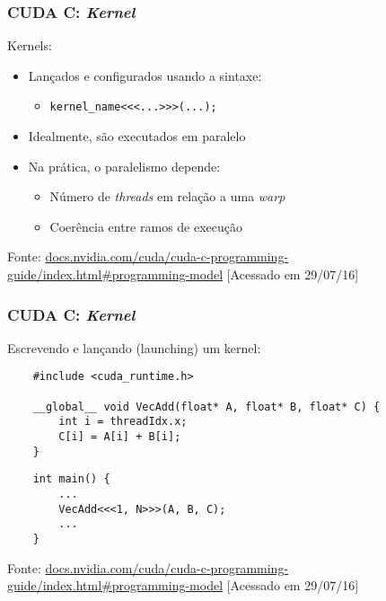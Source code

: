\documentclass[10pt, compress, aspectratio=43, xcolor={table,usenames,dvipsnames}]{beamer}
\begin{document}
\begin{frame}
    \frametitle{CUDA C: \textit{Kernel}}
    \alert{Kernels}:
    \begin{itemize}
        \item Lançados e configurados usando a sintaxe:
            \begin{itemize}
                \item \texttt{kernel\_name\alert{<<<}...\alert{>>>}(...);}
            \end{itemize}
        \item Idealmente, são executados em \alert{paralelo}
        \item Na prática, o paralelismo depende:
            \begin{itemize}
                \item Número de \textit{threads} em relação a uma \textit{warp}
                \item Coerência entre ramos de execução
            \end{itemize}
    \end{itemize}

    \vfill

    \begin{center}
        \tiny{Fonte: \url{docs.nvidia.com/cuda/cuda-c-programming-guide/index.html\#programming-model} [Acessado em 29/07/16]}
    \end{center}
\end{frame}

\begin{frame}[fragile]
    \frametitle{CUDA C: \textit{Kernel}}
    Escrevendo e \alert{lançando} (launching) um \alert{kernel}:
    \begin{verbatim}
    #include <cuda_runtime.h>

    __global__ void VecAdd(float* A, float* B, float* C) {
        int i = threadIdx.x;
        C[i] = A[i] + B[i];
    }
    \end{verbatim}

    \begin{verbatim}
    int main() {
        ...
        VecAdd<<<1, N>>>(A, B, C);
        ...
    }
    \end{verbatim}
    \vfill

    \begin{center}
        \tiny{Fonte: \url{docs.nvidia.com/cuda/cuda-c-programming-guide/index.html\#programming-model} [Acessado em 29/07/16]}
    \end{center}
\end{frame}
\end{document}
